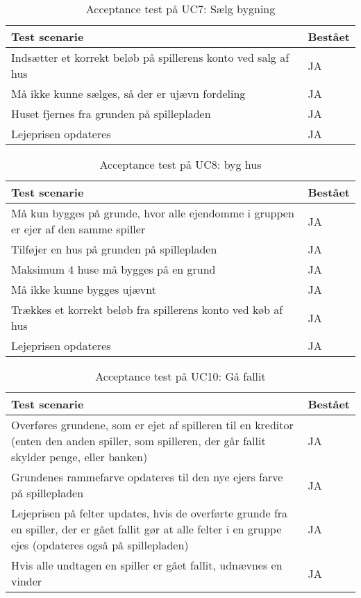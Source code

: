 \documentclass[class=article, crop=false]{standalone}
\begin{document}
    \begin{table}[H]
        \caption{Acceptance test på UC7: Sælg bygning }
        \begin{tabularx}{\textwidth}{|X|l|}
            \hline
            \textbf{Test scenarie}       & \textbf{Bestået}   \\ \hline
            Indsætter et korrekt beløb på spillerens konto ved salg af hus     & JA \\ \hline
            Må ikke kunne sælges, så der er ujævn fordeling     & JA \\ \hline
            Huset fjernes fra grunden på spillepladen     & JA \\ \hline
            Lejeprisen opdateres     & JA \\ \hline
        \end{tabularx}
    \end{table}

    \begin{table}[H]
        \caption{Acceptance test på UC8: byg hus}
        \begin{tabularx}{\textwidth}{|X|l|}
            \hline
            \textbf{Test scenarie}       & \textbf{Bestået}   \\ \hline
            Må kun bygges på grunde, hvor alle ejendomme i gruppen er ejer af den samme spiller     & JA \\ \hline
            Tilføjer en hus på grunden på spillepladen     & JA \\ \hline
            Maksimum 4 huse må bygges på en grund     & JA \\ \hline
            Må ikke kunne bygges ujævnt     & JA \\ \hline
            Trækkes et korrekt beløb fra spillerens konto ved køb af hus     & JA \\ \hline
            Lejeprisen opdateres     & JA \\ \hline
        \end{tabularx}
    \end{table}






    \begin{table}[H]
        \caption{Acceptance test på UC10: Gå fallit }
        \begin{tabularx}{\textwidth}{|X|l|}
            \hline
            \textbf{Test scenarie}       & \textbf{Bestået}   \\ \hline
            Overføres grundene, som er ejet af spilleren til en kreditor (enten den anden spiller, som spilleren, der går fallit skylder penge, eller banken)     & JA \\ \hline
            Grundenes rammefarve opdateres til den nye ejers farve på spillepladen     & JA \\ \hline
            Lejeprisen på felter updates, hvis de overførte grunde fra en spiller, der er gået fallit gør at alle felter i en gruppe ejes (opdateres også på spillepladen)     & JA \\ \hline
            Hvis alle undtagen en spiller er gået fallit, udnævnes en vinder    & JA \\ \hline
        \end{tabularx}
    \end{table}
\end{document}
